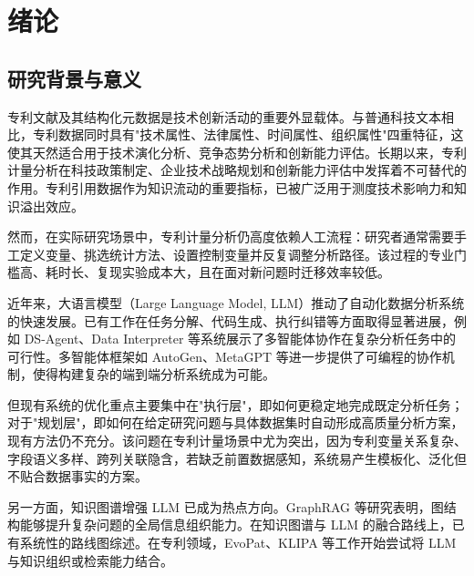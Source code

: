 
\newpage
\setcounter{table}{0}
\setcounter{figure}{0}
\section{绪论}

\subsection{研究背景与意义}

专利文献及其结构化元数据是技术创新活动的重要外显载体。与普通科技文本相比，专利数据同时具有"技术属性、法律属性、时间属性、组织属性"四重特征，这使其天然适合用于技术演化分析、竞争态势分析和创新能力评估\cite{basberg1987patents,trajtenberg1990penny,daim2006forecasting}。长期以来，专利计量分析在科技政策制定、企业技术战略规划和创新能力评估中发挥着不可替代的作用\cite{griliches1990patent,narin1997increasing,zhu2014patent}。专利引用数据作为知识流动的重要指标，已被广泛用于测度技术影响力和知识溢出效应\cite{hall2001nber,jaffe2000knowledge}。

然而，在实际研究场景中，专利计量分析仍高度依赖人工流程：研究者通常需要手工定义变量、挑选统计方法、设置控制变量并反复调整分析路径。该过程的专业门槛高、耗时长、复现实验成本大，且在面对新问题时迁移效率较低\cite{vanzeebroeck2011filing,mejia2024patent}。

近年来，大语言模型（Large Language Model, LLM）推动了自动化数据分析系统的快速发展\cite{zhao2024llm,brown2020language}。已有工作在任务分解、代码生成、执行纠错等方面取得显著进展，例如 DS-Agent\cite{guo2024dsagent}、Data Interpreter\cite{hong2025data} 等系统展示了多智能体协作在复杂分析任务中的可行性。多智能体框架如 AutoGen\cite{wu2023autogen}、MetaGPT\cite{hong2024metagpt} 等进一步提供了可编程的协作机制，使得构建复杂的端到端分析系统成为可能\cite{wang2024survey}。

但现有系统的优化重点主要集中在"执行层"，即如何更稳定地完成既定分析任务；对于"规划层"，即如何在给定研究问题与具体数据集时自动形成高质量分析方案，现有方法仍不充分\cite{sun2025survey}。该问题在专利计量场景中尤为突出，因为专利变量关系复杂、字段语义多样、跨列关联隐含，若缺乏前置数据感知，系统易产生模板化、泛化但不贴合数据事实的方案。

另一方面，知识图谱增强 LLM 已成为热点方向。GraphRAG\cite{edge2024graphrag} 等研究表明，图结构能够提升复杂问题的全局信息组织能力。在知识图谱与 LLM 的融合路线上，已有系统性的路线图综述\cite{pan2024unifying}。在专利领域，EvoPat\cite{wang2024evopat}、KLIPA\cite{deng2025klipa} 等工作开始尝试将 LLM 与知识组织或检索能力结合。

